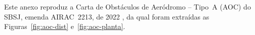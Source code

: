 Este anexo reproduz a Carta de Obstáculos de Aeródromo -- Tipo~A (AOC) do SBSJ, emenda AIRAC~2213, de 2022 \cite{decea2022aoc}, da qual foram extraídas as Figuras~\ref{fig:aoc-dist} e~\ref{fig:aoc-planta}.


